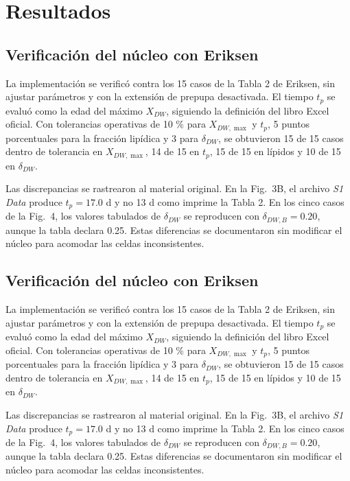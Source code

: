 \section{Resultados}

\subsection{Verificación del núcleo con Eriksen}

La implementación se verificó contra los 15 casos de la Tabla 2 de Eriksen, sin ajustar parámetros y con la extensión de prepupa desactivada. El tiempo $t_p$ se evaluó como la edad del máximo $X_{DW}$, siguiendo la definición del libro Excel oficial. Con tolerancias operativas de 10 \% para $X_{DW,\max}$ y $t_p$, 5 puntos porcentuales para la fracción lipídica y 3 para $\delta_{DW}$, se obtuvieron 15 de 15 casos dentro de tolerancia en $X_{DW,\max}$, 14 de 15 en $t_p$, 15 de 15 en lípidos y 10 de 15 en $\delta_{DW}$.

Las discrepancias se rastrearon al material original. En la Fig.~3B, el archivo \emph{S1 Data} produce $t_p=17.0$ d y no 13 d como imprime la Tabla 2. En los cinco casos de la Fig.~4, los valores tabulados de $\delta_{DW}$ se reproducen con $\delta_{DW,B}=0.20$, aunque la tabla declara 0.25. Estas diferencias se documentaron sin modificar el núcleo para acomodar las celdas inconsistentes.

\subsection{Verificación del núcleo con Eriksen}

La implementación se verificó contra los 15 casos de la Tabla 2 de Eriksen, sin ajustar parámetros y con la extensión de prepupa desactivada. El tiempo $t_p$ se evaluó como la edad del máximo $X_{DW}$, siguiendo la definición del libro Excel oficial. Con tolerancias operativas de 10 \% para $X_{DW,\max}$ y $t_p$, 5 puntos porcentuales para la fracción lipídica y 3 para $\delta_{DW}$, se obtuvieron 15 de 15 casos dentro de tolerancia en $X_{DW,\max}$, 14 de 15 en $t_p$, 15 de 15 en lípidos y 10 de 15 en $\delta_{DW}$.

Las discrepancias se rastrearon al material original. En la Fig.~3B, el archivo \emph{S1 Data} produce $t_p=17.0$ d y no 13 d como imprime la Tabla 2. En los cinco casos de la Fig.~4, los valores tabulados de $\delta_{DW}$ se reproducen con $\delta_{DW,B}=0.20$, aunque la tabla declara 0.25. Estas diferencias se documentaron sin modificar el núcleo para acomodar las celdas inconsistentes.

